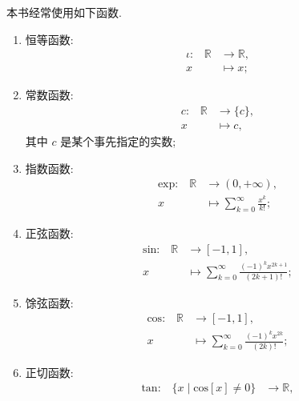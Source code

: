 \begin{definition}
    本书经常使用如下函数.
    \begin{enumerate}
        \item 恒等函数:
              \begin{align*}
                  \text{$\iota$:} \quad
                  \mathbb{R} & \to \mathbb{R}, \\
                  x          & \mapsto x;
              \end{align*}
        \item 常数函数:
              \begin{align*}
                  \text{$c$:} \quad
                  \mathbb{R} & \to \{ c \}, \\
                  x          & \mapsto c,
              \end{align*}
              其中 $c$ 是某个事先指定的实数;
        \item 指数函数:
              \begin{align*}
                  \text{$\mathrm{exp}$:} \quad
                  \mathbb{R} & \to (0, +\infty),                               \\
                  x          & \mapsto \sum_{k = 0}^{\infty} {\frac{x^k}{k!}};
              \end{align*}
        \item 正弦函数:
              \begin{align*}
                  \text{$\mathrm{sin}$:} \quad
                  \mathbb{R} & \to [-1, 1],                                                     \\
                  x          & \mapsto \sum_{k = 0}^{\infty} {\frac{(-1)^k x^{2k+1}}{(2k+1)!}};
              \end{align*}
        \item 馀弦函数:
              \begin{align*}
                  \text{$\mathrm{cos}$:} \quad
                  \mathbb{R} & \to [-1, 1],                                                 \\
                  x          & \mapsto \sum_{k = 0}^{\infty} {\frac{(-1)^k x^{2k}}{(2k)!}};
              \end{align*}
        \item 正切函数:
              \begin{align*}
                  \text{$\mathrm{tan}$:} \quad
                  \{ x \mid \mathrm{cos} {[x]} \neq 0 \} & \to \mathbb{R},                                        \\

\end{align*}
\end{enumerate}
\end{definition}
